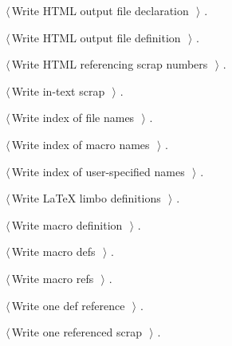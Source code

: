 \documentclass[a4paper]{report}
\begin{document}
{\begin{list}{}{\setlength{\itemsep}{-\parsep}\setlength{\itemindent}{-\leftmargin}}
\item $\langle\,$Write HTML output file declaration\nobreak\ {\footnotesize {}}$\,\rangle$ {\footnotesize {\NWtxtRefIn} .}
\item $\langle\,$Write HTML output file definition\nobreak\ {\footnotesize {}}$\,\rangle$ {\footnotesize {\NWtxtRefIn} .}
\item $\langle\,$Write HTML referencing scrap numbers\nobreak\ {\footnotesize {}}$\,\rangle$ {\footnotesize {\NWtxtRefIn} .}
\item $\langle\,$Write in-text scrap\nobreak\ {\footnotesize {}}$\,\rangle$ {\footnotesize {\NWtxtRefIn} .}
\item $\langle\,$Write index of file names\nobreak\ {\footnotesize {}}$\,\rangle$ {\footnotesize {\NWtxtRefIn} .}
\item $\langle\,$Write index of macro names\nobreak\ {\footnotesize {}}$\,\rangle$ {\footnotesize {\NWtxtRefIn} .}
\item $\langle\,$Write index of user-specified names\nobreak\ {\footnotesize {}}$\,\rangle$ {\footnotesize {\NWtxtRefIn} .}
\item $\langle\,$Write LaTeX limbo definitions\nobreak\ {\footnotesize {}}$\,\rangle$ {\footnotesize {\NWtxtRefIn} .
}
\item $\langle\,$Write macro definition\nobreak\ {\footnotesize {}}$\,\rangle$ {\footnotesize {\NWtxtRefIn} .}
\item $\langle\,$Write macro defs\nobreak\ {\footnotesize {}}$\,\rangle$ {\footnotesize {\NWtxtRefIn} .}
\item $\langle\,$Write macro refs\nobreak\ {\footnotesize {}}$\,\rangle$ {\footnotesize {\NWtxtRefIn} .}
\item $\langle\,$Write one def reference\nobreak\ {\footnotesize {}}$\,\rangle$ {\footnotesize {\NWtxtRefIn} .}
\item $\langle\,$Write one referenced scrap\nobreak\ {\footnotesize {}}$\,\rangle$ {\footnotesize {\NWtxtRefIn} .
}
\end{list}}
\end{document}

